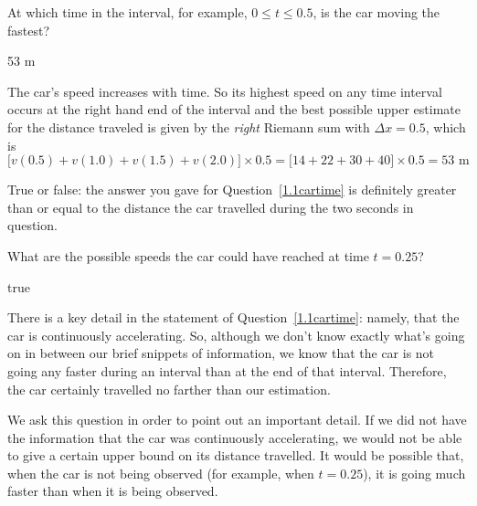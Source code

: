 \begin{hint}
At which time in the interval, for example, $0\le t\le 0.5$,  is the car moving
the fastest?
\end{hint}

\begin{answer}
53 m
\end{answer}

\begin{solution}
The car's speed increases with time. So its highest speed on any
time interval occurs at the right hand end of the interval and
the best possible upper estimate for the distance traveled is
given by the \emph{right} Riemann sum with $\Delta x =0.5$, which
is
\begin{equation*}
\big[v(0.5)+v(1.0)+v(1.5)+v(2.0)\big]\times 0.5
=\big[14+22+30+40\big]\times 0.5= 53\text{ m}
\end{equation*}
\end{solution}


\begin{Mquestion} True or false: the answer you gave for Question~\ref{1.1cartime} is definitely greater than or equal
to the distance the car travelled during the two seconds in question.
\end{Mquestion}
\begin{hint}
What are the possible speeds the car could have reached at time $t=0.25$?
\end{hint}
\begin{answer}
true
\end{answer}
\begin{solution}
There is a key detail in the statement of Question~\ref{1.1cartime}: namely, that the car is continuously accelerating. So, although we don't know exactly what's going on in between our brief snippets of information, we know that the car is not going any faster during an interval than at the end of that interval. Therefore, the car certainly travelled no farther than our estimation.

We ask this question in order to point out an important detail. If we did not have the information that the car was continuously accelerating, we would not be able to give a certain upper bound on its distance travelled. It would be possible that, when the car is not being observed (for example, when $t=0.25$), it is going much faster than when it is being observed.
\end{solution}



